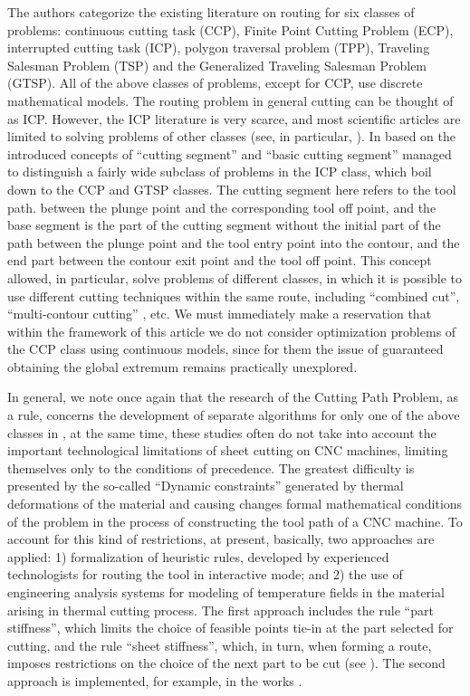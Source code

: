 \documentclass[10pt]{article}
\begin{document}
The authors categorize the existing literature on routing
for six classes of problems:
continuous cutting task (CCP),
Finite Point Cutting Problem (ECP),
interrupted cutting task (ICP),
polygon traversal problem (TPP),
Traveling Salesman Problem (TSP)
and the Generalized Traveling Salesman Problem (GTSP).
All of the above classes of problems, except for CCP, use discrete mathematical models.
The routing problem in general cutting can be thought of as ICP.
However, the ICP literature is very scarce,
and most scientific articles are limited to solving problems of other classes (see, in particular, \cite{bibx:301}).
In \cite{bibx:112}
based on the introduced concepts of ``cutting segment''
and ``basic cutting segment''
managed to distinguish a fairly wide subclass of problems in the ICP class,
which boil down to the CCP and GTSP classes.
The cutting segment here refers to the tool path.
between the plunge point and the corresponding tool off point, and the base segment is the part of the cutting segment without the initial part of the path between the plunge point and the tool entry point into the contour,
and the end part between the contour exit point and the tool off point.
This concept allowed, in particular,
solve problems of different classes,
in which it is possible to use different cutting techniques within the same route,
including ``combined cut'', ``multi-contour cutting''
\cite[part I] {4}, etc.
We must immediately make a reservation that within the framework of this article we do not consider optimization problems of the CCP class using continuous models,
since for them the issue of guaranteed obtaining the global extremum remains practically unexplored.


In general, we note once again that the research of the Cutting Path Problem, as a rule, concerns the development of separate algorithms for only one of the above classes in \cite{bibx:109},
at the same time,
these studies often do not take into account the important technological limitations of sheet cutting on CNC machines,
limiting themselves only to the conditions of precedence.
The greatest difficulty is presented by the so-called ``Dynamic constraints''
generated by thermal deformations of the material and causing changes
formal mathematical conditions of the problem
in the process of constructing the tool path of a CNC machine.
To account for this kind of restrictions, at present, basically,
two approaches are applied:
1) formalization of heuristic rules,
developed by experienced technologists for routing the tool in
interactive mode; and
2) the use of engineering analysis systems for
modeling of temperature fields in the material arising in
thermal cutting process.
The first approach includes the rule
``part stiffness'',
which limits the choice of feasible points
tie-in at the part selected for cutting, and the rule
``sheet stiffness'',
which, in turn, when forming a route, imposes restrictions on the choice of the next part to be cut
(see \cite[part I]{4}).
The second approach is implemented, for example, in the works \cite{bibx:114,bibx:116}.
\end{document}
